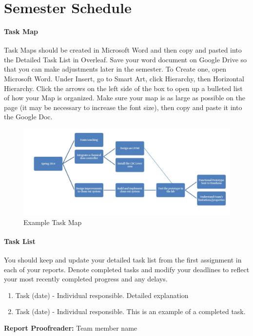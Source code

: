 \documentclass[a4paper]{article}
\begin{document}



\clearpage

\part*{Semester Schedule}

\subsection*{Task Map}
Task Maps should be created in Microsoft Word and then copy and pasted into the Detailed Task List in Overleaf. Save your word document on Google Drive so that you can make adjustments later in the semester.
To Create one, open Microsoft Word. Under Insert, go to Smart Art, click Hierarchy, then Horizontal Hierarchy.  Click the arrows on the left side of the box to open up a bulleted list of how your Map is organized. Make sure your map is as large as possible on the page (it may be necessary to increase the font size), then copy and paste it into the Google Doc.

\begin{figure}[H]
\centering
\includegraphics[scale=0.5]{ExampleTaskMap}
\caption{Example Task Map}
\label{ExampleTaskMap}
\end{figure}

\subsection*{Task List}
 You should keep and update your detailed task list from the first assignment in each of your reports. Denote completed tasks and modify your deadlines to reflect your most recently completed progress and any delays.
 
\begin{enumerate}
\item Task (date) - Individual responsible. Detailed explanation 
\item \checkmark Task (date) - Individual responsible. This is an example of a completed task.

\end{enumerate}
\textbf{Report Proofreader: }Team member name 
\end{document}
